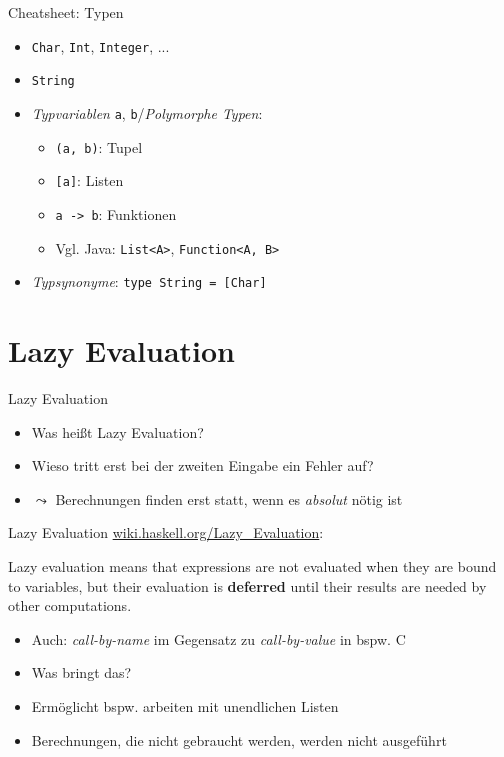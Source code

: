 \documentclass{beamer}
\begin{document}
\begin{frame}{Cheatsheet: Typen}
  \begin{itemize}
    \item \texttt{Char}, \texttt{Int}, \texttt{Integer}, ...
    \item \texttt{String}
    \item \emph{Typvariablen} \texttt{a}, \texttt{b}/\emph{Polymorphe Typen}:
    \begin{itemize}
      \item \texttt{(a, b)}: Tupel
      \item \texttt{[a]}: Listen
      \item \texttt{a -> b}: Funktionen
      \item Vgl. Java: \texttt{List<A>}, \texttt{Function<A, B>}
    \end{itemize}
    \item \emph{Typsynonyme}: \texttt{type String = [Char]}
  \end{itemize}
\end{frame}


\section{Lazy Evaluation}

\begin{frame}{Lazy Evaluation}

	\begin{itemize}
		\item Was heißt Lazy Evaluation?
		\item Wieso tritt erst bei der zweiten Eingabe ein Fehler auf?
		\pause
		\item $\leadsto$ Berechnungen finden erst statt, wenn es \emph{absolut} nötig ist
	\end{itemize}
\end{frame}

\begin{frame}{Lazy Evaluation}
      \href{https://wiki.haskell.org/Lazy\_evaluation}{wiki.haskell.org/Lazy\_Evaluation}:

	\begin{displayquote}
		Lazy evaluation means that expressions are not evaluated when they are bound to variables, but their evaluation is \textbf{deferred} until their results are needed by other computations.
	\end{displayquote}

	\begin{itemize}
		\item Auch: \emph{call-by-name} im Gegensatz zu \emph{call-by-value} in bspw. C
		\item Was bringt das?
		\pause
		\item Ermöglicht bspw. arbeiten mit unendlichen Listen
		\item Berechnungen, die nicht gebraucht werden, werden nicht ausgeführt
	\end{itemize}
\end{frame}
\end{document}
